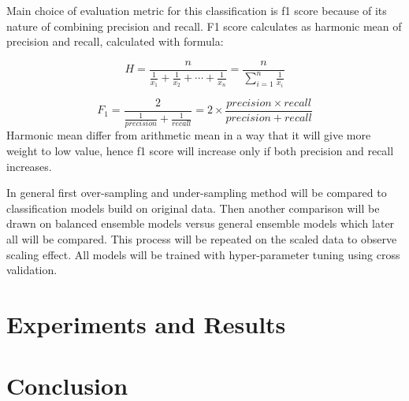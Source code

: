 \documentclass[12pt]{article}
\begin{document}
Main choice of evaluation metric for this classification is f1 score because of its nature of combining precision and recall. F1 score calculates as harmonic mean of precision and recall, calculated with formula:

\begin{equation*}
    H = \frac{n}{\frac{1}{x_{1}} + \frac{1}{x_{2}} + \cdots + \frac{1}{x_{n}}} = \frac{n}{\sum_{i=1}^n{\frac{1}{x_{i}}}}
\end{equation*}

\begin{equation*}
    F_{1} = \frac{2}{\frac{1}{precision} + \frac{1}{recall}} = 2 \times \frac{precision \times recall}{precision + recall}
\end{equation*}
Harmonic mean differ from arithmetic mean in a way that it will give more weight to low value, hence f1 score will increase only if both precision and recall increases.

In general first over-sampling and under-sampling method will be compared to classification models build on original data. Then another comparison will be drawn on balanced ensemble models versus general ensemble models which later all will be compared. This process will be repeated on the scaled data to observe scaling effect. All models will be trained with hyper-parameter tuning using cross validation.

\section{Experiments and Results} \label{sec:experiment}

\section{Conclusion} \label{sec:conclution}

\printbibliography
\end{document}
